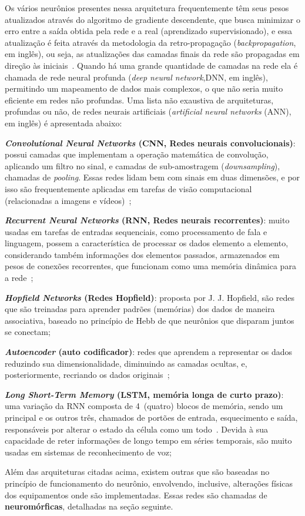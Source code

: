 Os vários neurônios presentes nessa arquitetura frequentemente têm seus pesos atualizados através do algoritmo de gradiente descendente, que busca minimizar o erro entre a saída obtida pela rede e a real (aprendizado supervisionado), e essa atualização é feita através da metodologia da retro-propagação (\textit{backpropagation}, em inglês), ou seja, as atualizações das camadas finais da rede são propagadas em direção às iniciais~\cite{werbos_beyond_1974}. Quando há uma grande quantidade de camadas na rede ela é chamada de rede neural profunda (\textit{deep neural network},DNN, em inglês), permitindo um mapeamento de dados mais complexos, o que não seria muito eficiente em redes não profundas. Uma lista não exaustiva de arquiteturas, profundas ou não, de redes neurais artificiais (\textit{artificial neural networks} (ANN), em inglês) é apresentada abaixo:
\begin{alineas}
	\item \textbf{\textit{Convolutional Neural Networks} (CNN, Redes neurais convolucionais)}: possui camadas que implementam a operação matemática de convolução, aplicando um filtro no sinal, e camadas de sub-amostragem (\textit{downsampling}), chamadas de \textit{pooling}. Essas redes lidam bem com sinais em duas dimensões, e por isso são frequentemente aplicadas em tarefas de visão computacional (relacionadas a imagens e vídeos)~\cite{lecun_gradient-based_1998};
	\item \textbf{\textit{Recurrent Neural Networks} (RNN, Redes neurais recorrentes)}: muito usadas em tarefas de entradas sequenciais, como processamento de fala e linguagem, possem a característica de processar os dados elemento a elemento, considerando também informações dos elementos passados, armazenados em pesos de conexões recorrentes, que funcionam como uma memória dinâmica para a rede~\cite{elman_finding_1990};
	\item \textbf{\textit{Hopfield Networks} (Redes Hopfield)}: proposta por J. J. Hopfield, são redes que são treinadas para aprender padrões (memórias) dos dados de maneira associativa, baseado no princípio de Hebb de que neurônios que disparam juntos se conectam;
	\item \textbf{\textit{Autoencoder} (auto codificador)}: redes que aprendem a representar os dados reduzindo sua dimensionalidade, diminuindo as camadas ocultas, e, posteriormente, recriando os dados originais~\cite{hinton_reducing_2006};
	\item \textbf{\textit{Long Short-Term Memory} (LSTM, memória longa de curto prazo)}: uma variação da RNN composta de 4~(quatro) blocos de memória, sendo um principal e os outros três, chamados de portões de entrada, esquecimento e saída, responsáveis por alterar o estado da célula como um todo~\cite{hochreiter_long_1997}.	Devida à sua capacidade de reter informações de longo tempo em séries temporais, são muito usadas em sistemas de reconhecimento de voz;
\end{alineas}
Além das arquiteturas citadas acima, existem outras que são baseadas no princípio de funcionamento do neurônio, envolvendo, inclusive, alterações físicas dos equipamentos onde são implementadas. Essas redes são chamadas de \textbf{neuromórficas}, detalhadas na seção seguinte.

